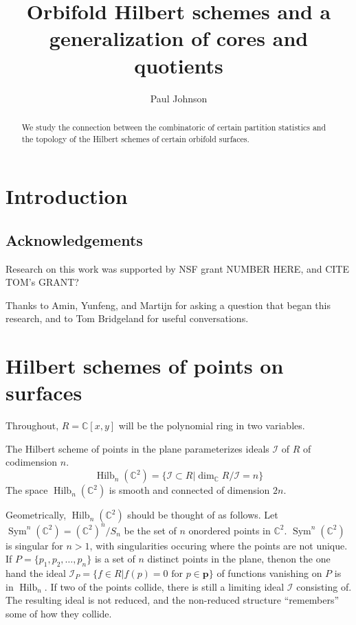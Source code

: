 \documentclass{amsart}[12pt]
\theoremstyle{definition}
\newcommand{\C}{\mathbb{C}}
\DeclareMathOperator{\Hilb}{Hilb}
\DeclareMathOperator{\Sym}{Sym}
\begin{document}
\begin{abstract}
We study the connection between the combinatoric of certain partition statistics and the topology of the Hilbert schemes of certain orbifold surfaces.
\end{abstract}


\title{Orbifold Hilbert schemes and a generalization of cores and quotients}


\author{Paul Johnson}
\address{University of Sheffield}


\maketitle
\tableofcontents
\section{Introduction}
\cite{GLMpower}

\subsection{Acknowledgements}

Research on this work was supported by NSF grant NUMBER HERE, and CITE TOM's GRANT?

Thanks to Amin, Yunfeng, and Martijn for asking a question that began this research, and to Tom Bridgeland for useful conversations.

\section{Hilbert schemes of points on surfaces}

Throughout, $R=\C[x,y]$ will be the polynomial ring in two variables.  

The Hilbert scheme of points in the plane parameterizes ideals $\mathcal{I}$ of $R$ of codimension $n$.
$$\Hilb_n(\C^2)=\{\mathcal{I}\subset R | \dim_\C R/\mathcal{I}=n\}$$
The space $\Hilb_n(\C^2)$ is smooth and connected of dimension $2n$.

Geometrically, $\Hilb_n(\C^2)$ should be thought of as follows.  Let $\Sym^n(\C^2)=(\C^2)^n/S_n$ be the set of $n$ onordered points in $\C^2$.  $\Sym^n(\C^2)$ is singular for $n>1$, with singularities occuring where the points are not unique.  
If $P=\{p_1,p_2,\dots, p_n\}$ is a set of $n$ distinct points in the plane, thenon the one hand the ideal $\mathcal{I}_{P}=\{f\in R| f(p)=0 \text{ for }p\in \mathbf{p}\}$ of functions vanishing on $P$ is in $\Hilb_n$.  If two of the points collide, there is still a limiting ideal $\mathcal{I}$ consisting of.  The resulting ideal is not reduced, and the non-reduced structure ``remembers'' some of how they collide.
\end{document}
